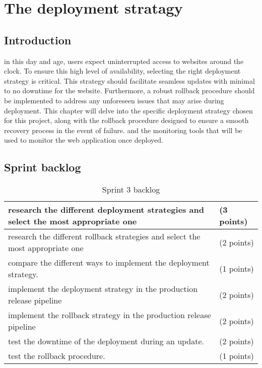 \chapter{The deployment stratagy}
\section{Introduction}
in this day and age, users expect uninterrupted access to websites around the clock.  To ensure this high level of availability, selecting the right deployment strategy is critical.  This strategy should facilitate seamless updates with minimal to no downtime for the website.  Furthermore, a robust rollback procedure should be implemented to address any unforeseen issues that may arise during deployment.  This chapter will delve into the specific deployment strategy chosen for this project, along with the rollback procedure designed to ensure a smooth recovery process in the event of failure. and the monitoring tools that will be used to monitor the web application once deployed.
\section{Sprint backlog}
\begin{longtable}[c]{
    |p{}|
    p{}|
    }
    \caption{Sprint 3 backlog}
    \label{tab:Sprint3_backlog}                                                                   \\
    \hline
    research the different deployment strategies and select the most appropriate one & (3 points) \\
    \hline
    research the different rollback strategies and select the most appropriate one   & (2 points) \\
    \hline
    compare the different ways to implement the deployment strategy.                 & (1 points) \\
    \hline
    implement the deployment strategy in the production release pipeline             & (2 points) \\
    \hline
    implement the rollback strategy in the production release pipeline               & (2 points) \\
    \hline
    test the downtime of the deployment during an update.                            & (2 points) \\
    \hline
    test the rollback procedure.                                                     & (1 points) \\ \hline
\end{longtable}
